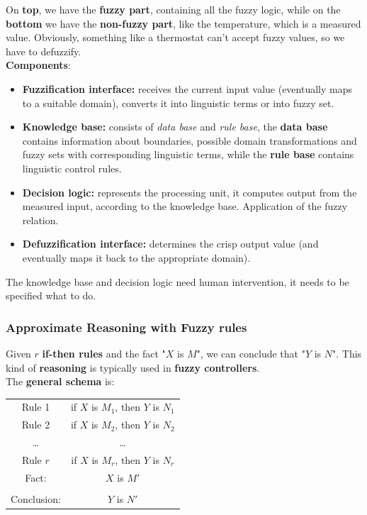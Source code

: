 On \textbf{top}, we have the \textbf{fuzzy part}, containing all the fuzzy logic, while on the \textbf{bottom} we have the \textbf{non-fuzzy part}, like the temperature, which is a measured value. Obviously, something like a thermostat can't accept fuzzy values, so we have to defuzzify.\\

\textbf{Components}:
\begin{itemize}
	\item \textbf{Fuzzification interface:} receives the current input value (eventually maps to a suitable domain), converts it into linguistic terms or into fuzzy set.\\
	
	\item \textbf{Knowledge base:} consists of \textit{data base} and \textit{rule base}, the \textbf{data base} contains information about boundaries, possible domain transformations and fuzzy sets with corresponding linguistic terms, while the \textbf{rule base} contains linguistic control rules.\\
	
	\item \textbf{Decision logic:} represents the processing unit, it computes output from the measured input, according to the knowledge base. Application of the fuzzy relation.\\
	
	\item \textbf{Defuzzification interface:} determines the crisp output value (and eventually maps it back to the appropriate domain).\\
\end{itemize}

The knowledge base and decision logic need human intervention, it needs to be specified what to do.

\newpage

\subsubsection{Approximate Reasoning with Fuzzy rules}

Given $r$ \textbf{if-then rules} and the fact "$X$ is $M$", we can conclude that "$Y$ is $N$". This kind of \textbf{reasoning} is typically used in \textbf{fuzzy controllers}. \\

The \textbf{general schema} is:
\begin{center}
	\begin{tabular}{c c}
		Rule 1 & if $X$ is $M_1$, then $Y$ is $N_1$ \\
		Rule 2 & if $X$ is $M_2$, then $Y$ is $N_2$ \\
		\dots & \dots \\
		Rule $r$ & if $X$ is $M_r$, then $Y$ is $N_r$ \\
		Fact: & $X$ is $M'$ \\
		\hline & \\
		Conclusion: & $Y$ is $N'$
	\end{tabular}
\end{center}

